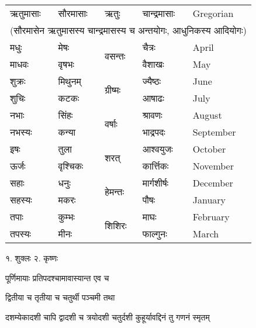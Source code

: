 \begin{longtable}{lllll}
  ऋतुमासाः & सौरमासाः & ऋतुः    & चान्द्रमासाः & \textsf{\normalsize Gregorian} \\
  \multicolumn{5}{c}{\small (सौरमासेन ऋतुमासस्य चान्द्रमासस्य च अन्तयोगः, आधुनिकस्य आदियोगः)}\\\hline\endhead
  मधुः     & मेषः      & \multirow{2}{*}{वसन्तः}  & चैत्रः       & \textsf{\normalsize April}    \\*
  माधवः   & वृषभः     &   & वैशाखः      & \textsf{\normalsize May}       \\\hline
  शुक्रः    & मिथुनम्    & \multirow{2}{*}{ग्रीष्मः} & ज्यैष्ठः      & \textsf{\normalsize June}    \\*
  शुचिः    & कटकः     &  & आषाढः      & \textsf{\normalsize July}      \\\hline
  नभाः    & सिंहः     & \multirow{2}{*}{वर्षाः}  & श्रावणः     & \textsf{\normalsize August}     \\*
  नभस्यः   & कन्या     &   & भाद्रपदः    & \textsf{\normalsize September} \\\hline
  इषः     & तुला      & \multirow{2}{*}{शरत्}    & आश्वयुजः     & \textsf{\normalsize October}\\*
  ऊर्जः    & वृश्चिकः   &     & कार्त्तिकः   & \textsf{\normalsize November}  \\\hline
  सहाः    & धनुः      & \multirow{2}{*}{हेमन्तः}  & मार्गशीर्षः  & \textsf{\normalsize December}  \\*
  सहस्यः   & मकरः     &   & पौषः       & \textsf{\normalsize January}   \\\hline
  तपाः    & कुम्भः     & \multirow{2}{*}{शिशिरः} & माघः       & \textsf{\normalsize February}  \\*
  तपस्यः   & मीनः     &  & फाल्गुनः     & \textsf{\normalsize March}     \\\hline
\end{longtable}


१. शुक्लः \hspace{2em} २. कृष्णः


{पूर्णिमायाः प्रतिपदश्चामावास्यान्त एव च}

{द्वितीया च तृतीया च चतुर्थी पञ्चमी तथा}

{दशम्येकादशी चापि द्वादशी च त्रयोदशी}
{चतुर्दशी कुहूर्यावद्दिनं तु गणनं स्मृतम्}

